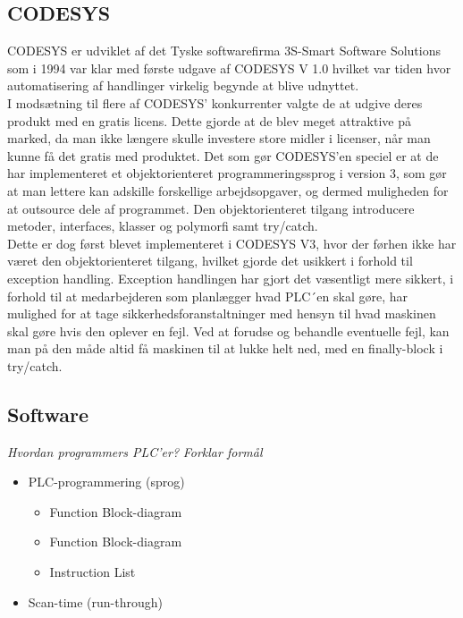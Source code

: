 \subsection{CODESYS}
CODESYS er udviklet af det Tyske softwarefirma 3S-Smart Software Solutions som i 1994 var klar med første udgave af CODESYS V 1.0 hvilket var tiden hvor automatisering af handlinger virkelig begynde at blive udnyttet.\\
I modsætning til flere af CODESYS’ konkurrenter valgte de at udgive deres produkt med en gratis licens. Dette gjorde at de blev meget attraktive på marked, da man ikke længere skulle investere store midler i licenser, når man kunne få det gratis med produktet.
Det som gør CODESYS’en speciel er at de har implementeret et objektorienteret  programmeringssprog i version 3, som gør at man lettere kan adskille forskellige arbejdsopgaver, og dermed muligheden for at outsource dele af programmet.
Den objektorienteret tilgang introducere metoder, interfaces, klasser og polymorfi samt try/catch.\\
Dette er dog først blevet implementeret i CODESYS V3, hvor der førhen ikke har været den objektorienteret tilgang, hvilket gjorde det usikkert i forhold til exception handling.
Exception handlingen har gjort det væsentligt mere sikkert, i forhold til at medarbejderen som planlægger hvad PLC´en skal gøre, har mulighed for at tage sikkerhedsforanstaltninger med hensyn til hvad maskinen skal gøre hvis den oplever en fejl.
Ved at forudse og behandle eventuelle fejl, kan man på den måde altid få maskinen til at lukke helt ned, med en finally-block i try/catch.



\subsection{Software}
\textit{Hvordan programmers PLC'er?}
\textit{Forklar formål}
\begin{itemize}
    \item PLC-programmering (sprog)
    \begin{itemize}
        \item Function Block-diagram
        \item Function Block-diagram
        \item Instruction List
    \end{itemize}
    \item Scan-time (run-through)
\end{itemize}




